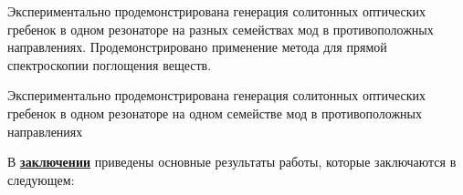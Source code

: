 Экспериментально продемонстрирована генерация солитонных оптических гребенок в одном резонаторе на разных семействах мод в противоположных направлениях. Продемонстрировано применение метода для прямой спектроскопии поглощения веществ.

Экспериментально продемонстрирована генерация солитонных оптических гребенок в одном резонаторе на одном семействе мод в противоположных направлениях

В \underline{\textbf{заключении}} приведены основные результаты работы, которые заключаются в следующем:





